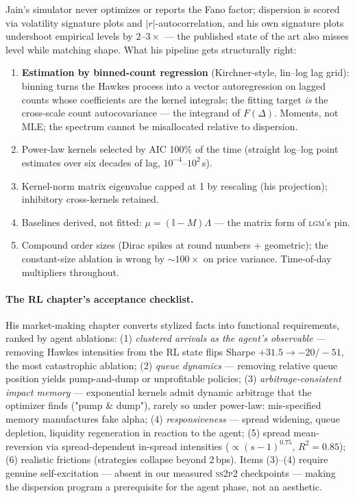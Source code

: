\documentclass[11pt]{article}
\newcommand{\sspp}{\textsc{ss2p2}}
\newcommand{\lgm}{\textsc{lgm}}
\newcommand{\Fano}{F}
\begin{document}
Jain's simulator never optimizes or reports the Fano factor; dispersion is scored via
volatility signature plots and $|r|$-autocorrelation, and his own signature plots
undershoot empirical levels by $2$--$3\times$ --- the published state of the art also
misses level while matching shape. What his pipeline gets structurally right:
\begin{enumerate}
\item \textbf{Estimation by binned-count regression} (Kirchner-style, lin--log lag
grid): binning turns the Hawkes process into a vector autoregression on lagged counts
whose coefficients are the kernel integrals; the fitting target \emph{is} the
cross-scale count autocovariance --- the integrand of $\Fano(\Delta)$. Moments, not
MLE; the spectrum cannot be misallocated relative to dispersion.
\item Power-law kernels selected by AIC 100\% of the time (straight log--log point
estimates over six decades of lag, $10^{-4}$--$10^{2}$\,s).
\item Kernel-norm matrix eigenvalue capped at 1 by rescaling (his projection);
inhibitory cross-kernels retained.
\item Baselines derived, not fitted: $\mu=(\mathbb{I}-M)\Lambda$ --- the matrix form
of \lgm{}'s pin.
\item Compound order sizes (Dirac spikes at round numbers + geometric); the
constant-size ablation is wrong by $\sim$$100\times$ on price variance. Time-of-day
multipliers throughout.
\end{enumerate}

\paragraph{The RL chapter's acceptance checklist.} His market-making chapter converts
stylized facts into functional requirements, ranked by agent ablations: (1)
\emph{clustered arrivals as the agent's observable} --- removing Hawkes intensities
from the RL state flips Sharpe $+31.5\to-20/-51$, the most catastrophic ablation; (2)
\emph{queue dynamics} --- removing relative queue position yields pump-and-dump or
unprofitable policies; (3) \emph{arbitrage-consistent impact memory} --- exponential
kernels admit dynamic arbitrage that the optimizer finds ("pump \& dump"), rarely so
under power-law: mis-specified memory manufactures fake alpha; (4)
\emph{responsiveness} --- spread widening, queue depletion, liquidity regeneration in
reaction to the agent; (5) spread mean-reversion via spread-dependent in-spread
intensities ($\propto (s-1)^{0.75}$, $R^2=0.85$); (6) realistic frictions (strategies
collapse beyond 2\,bps). Items (3)--(4) require genuine self-excitation --- absent in
our measured \sspp{} checkpoints --- making the dispersion program a prerequisite for
the agent phase, not an aesthetic.
\end{document}
